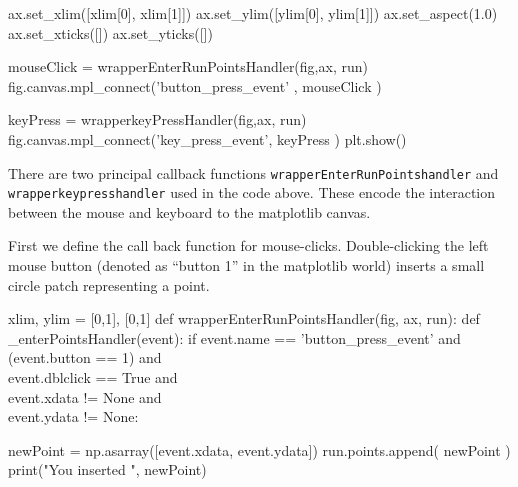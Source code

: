     ax.set_xlim([xlim[0], xlim[1]])
    ax.set_ylim([ylim[0], ylim[1]])
    ax.set_aspect(1.0)
    ax.set_xticks([])
    ax.set_yticks([])
      
    mouseClick   = wrapperEnterRunPointsHandler(fig,ax, run)
    fig.canvas.mpl_connect('button_press_event' , mouseClick )
      
    keyPress     = wrapperkeyPressHandler(fig,ax, run)
    fig.canvas.mpl_connect('key_press_event', keyPress   )
    plt.show()
\nwendcode{}\nwdocspar



There are two principal callback functions \verb|wrapperEnterRunPointshandler| and \verb|wrapperkeypresshandler| used in the code above. 
These encode the interaction between the mouse and keyboard to the matplotlib canvas. 

First we define the call back function for mouse-clicks. Double-clicking the left mouse button (denoted as ``button 1'' in the matplotlib world)
inserts a small circle patch representing a point. 

\nwenddocs{}\plusendmoddef\nwstartdeflinemarkup{}\nwenddeflinemarkup
xlim, ylim = [0,1], [0,1]
def wrapperEnterRunPointsHandler(fig, ax, run):
    def _enterPointsHandler(event):
        if event.name      == 'button_press_event'     and \\
           (event.button   == 1)                       and \\
            event.dblclick == True                     and \\
            event.xdata  != None                       and \\
            event.ydata  != None:

             newPoint = np.asarray([event.xdata, event.ydata])
             run.points.append( newPoint  )
             print("You inserted ", newPoint)

